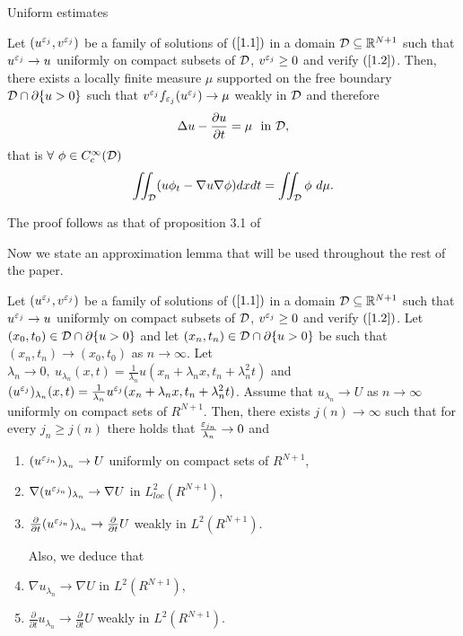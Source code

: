\begin{section}{Uniform estimates}
\begin{prop}
Let $(u^{\varepsilon_{j}}, v^{\varepsilon_{j}})$ be a family of solutions of $(\ref{1.1})$ in a 
domain ${\cal D}\subseteq {\Bbb R}^{N+1}$ such that $u^{\varepsilon_{j}}\to u$ 
uniformly on compact subsets of ${\cal D}$, $v^{\varepsilon_{j}}\ge0$ and verify 
$(\ref{1.2})$. Then, there exists a locally finite measure $\mu$ supported on 
the free boundary ${\cal D}\cap \partial \{ u>0 \}$ such that
$v^{\varepsilon_j}f_{\varepsilon_{j}}(u^{\varepsilon_{j}})\to \mu$ weakly in ${\cal D}$ and 
therefore
$$\Delta u - \frac{\partial u}{\partial t} = \mu\ \mbox{ in } {\cal D},$$
that is $\forall \ \phi \in C^{\infty}_{c}({\cal D})$
$$\iint_{\cal D} (u\phi_{t} - \nabla u \nabla \phi) dx dt = 
\iint_{\cal D} \phi\ d\mu.$$
\end{prop}

\begin{pf}
The proof follows as that of proposition 3.1 of \cite{CLW1}
\end{pf}


Now we state an approximation lemma that will be used throughout the rest of 
the paper.

\begin{lema} 
\label{lim2}
Let $(u^{\varepsilon_{j}}, v^{\varepsilon_{j}})$ be a family of solutions of $(\ref{1.1})$ in a 
domain ${\cal D}\subseteq {\Bbb R}^{N+1}$ such that $u^{\varepsilon_{j}}\to u$ 
uniformly on compact subsets of ${\cal D}$, $v^{\varepsilon_{j}}\ge0$ and verify 
$(\ref{1.2})$. Let $(x_0,t_0)\in{\cal D}\cap\partial\{ u>0 \}$ and let 
$(x_n,t_n)\in{\cal D}\cap\partial\{ u>0 \}$ be such that 
$(x_n,t_n)\to (x_0,t_0)$ as $n\to \infty$. 
Let $\lambda_n\to 0,\ u_{\lambda_n}(x,t)=\frac{1}{\lambda_n}
u(x_n+\lambda_n x, t_n+\lambda_n^2 t)$ and $(u^{\varepsilon_j})_{\lambda_n}(x,t)=
\frac{1}{\lambda_n} u^{\varepsilon_j}(x_n+\lambda_n x, t_n+\lambda_n^2 t)$.
Assume that $u_{\lambda_n}\to U$ as $n\to\infty$ uniformly on compact sets 
of $R^{N+1}$. Then, there exists $j(n)\to\infty$ such that for every 
$j_n\ge j(n)$ there holds that $\frac{\varepsilon_{j_n}}{\lambda_n}\to 0$ and
\begin{enumerate}
\item $(u^{\varepsilon_{j_n}})_{\lambda_n}\to U$ uniformly on compact sets of 
$R^{N+1}$,
\item $\nabla(u^{\varepsilon_{j_n}})_{\lambda_n}\to \nabla U$ in $L^2_{loc}(R^{N+1})$, 
\item $\frac{\partial}{\partial t}(u^{\varepsilon_{j_n}})_{\lambda_n}\to
\frac{\partial}{\partial t}U$ weakly in $L^2(R^{N+1})$.

Also, we deduce that
\item $\nabla u_{\lambda_n}\to \nabla U$ in $L^2(R^{N+1})$,
\item $\frac{\partial}{\partial t}u_{\lambda_n}\to 
\frac{\partial}{\partial t}U$ weakly in $L^2(R^{N+1})$.
\end{enumerate}
\end{lema}


\end{section}
